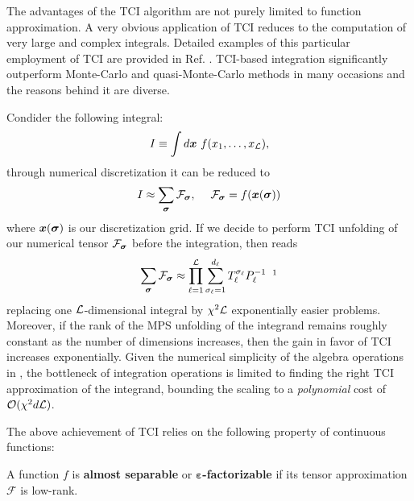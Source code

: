 The advantages of the TCI algorithm are not purely limited to function approximation. A very obvious application of TCI reduces to the computation of very large and complex integrals. Detailed examples of this particular employment of TCI are provided in Ref. \cite{Fernandez2022, Fernandez2024, Dolgov2020}. TCI-based integration significantly outperform Monte-Carlo and quasi-Monte-Carlo methods in many occasions and the reasons behind it are diverse. 

Condider the following integral:
\begin{equation}
	I \equiv \int d\boldsymbol{x} \ f(x_1,\dots,x_{\mathcal{L}}),
	\label{eq:LdimIntegral}
\end{equation}
through numerical discretization it can be reduced to 
\begin{equation}
	I \approx \sum_{\boldsymbol{\sigma}} \mathcal{F}_{\boldsymbol{\sigma}} ,\quad \; \mathcal{F}_{\boldsymbol{\sigma}} = f(\boldsymbol{x}(\boldsymbol{\sigma}))
	\label{eq:LdimapproxIntegral}
\end{equation}
where $\boldsymbol{x}(\boldsymbol{\sigma})$ is our discretization grid. If we decide to perform TCI unfolding of our numerical tensor $\mathcal{F}_{\boldsymbol{\sigma}}$ before the integration,  then reads
\begin{equation}
	\sum_{\bsigma} \mathcal{F}_{\bsigma} \approx \prod_{\ell=1}^\mL \sum^{d_\ell}_{\sigma_\ell = 1} T^{\sigma_\ell}_\ell P^{-1}_\ell \; \;\footnotemark
	\label{eq:LdimTCIIntegral}
\end{equation}
replacing one $\mathcal{L}$-dimensional integral by $\chi^2\mathcal{L}$ exponentially easier problems. Moreover, if the rank of the MPS unfolding of the integrand remains roughly constant as the number of dimensions increases, then the gain in favor of TCI increases exponentially. Given the numerical simplicity of the algebra operations in , the bottleneck of integration operations is limited to finding the right TCI approximation of the integrand, bounding the scaling to a \textit{polynomial} cost of $\mathcal{O} (\chi^2d\mathcal{L})$. 


The above achievement of TCI relies on the following property of continuous functions:
\begin{definition}
	A function $f$ is {\normalfont \textbf{almost separable}} \cite{Fernandez2024} or {\normalfont \textbf{$\boldsymbol{\varepsilon}$-factorizable}} \cite{Fernandez2022} if its tensor approximation $\mathcal{F}$ is low-rank.
	\label{def:separfunc}
\end{definition}

